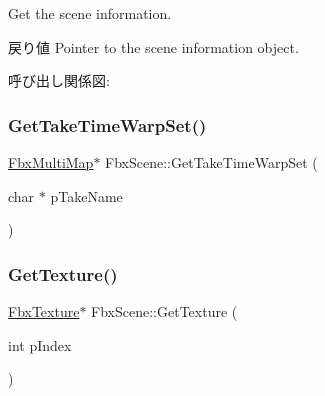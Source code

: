 Get the scene information. \begin{DoxyReturn}{戻り値}
Pointer to the scene information object. 
\end{DoxyReturn}
呼び出し関係図\+:
\mbox{\label{class_fbx_scene_a36e7860a68461f8fa9bf2a78285a36b6}} 
\subsubsection{\texorpdfstring{Get\+Take\+Time\+Warp\+Set()}{GetTakeTimeWarpSet()}}
{\footnotesize\ttfamily \hyperlink{class_fbx_multi_map}{Fbx\+Multi\+Map}$\ast$ Fbx\+Scene\+::\+Get\+Take\+Time\+Warp\+Set (\begin{DoxyParamCaption}\item[{char $\ast$}]{p\+Take\+Name }\end{DoxyParamCaption})}

\mbox{\label{class_fbx_scene_a0636380a7984fd690eb37720b5cc4f9a}} 
\subsubsection{\texorpdfstring{Get\+Texture()}{GetTexture()}\hspace{0.1cm}{\footnotesize\ttfamily [1/2]}}
{\footnotesize\ttfamily \hyperlink{class_fbx_texture}{Fbx\+Texture}$\ast$ Fbx\+Scene\+::\+Get\+Texture (\begin{DoxyParamCaption}\item[{int}]{p\+Index }\end{DoxyParamCaption})}

